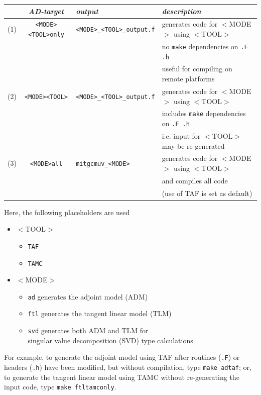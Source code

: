 \begin{table}[!ht]
{\footnotesize
\begin{tabular}{|ccll|}
\hline
~ & {\it AD-target} & {\it output} & {\it description} \\
\hline
\hline
(1) & {\tt <MODE><TOOL>only} & {\tt <MODE>\_<TOOL>\_output.f}  & 
generates code for $<$MODE$>$ using $<$TOOL$>$ \\
~ & ~ & ~ & no {\tt make} dependencies on {\tt .F .h} \\
~ & ~ & ~ & useful for compiling on remote platforms \\
\hline
(2) & {\tt <MODE><TOOL>} & {\tt <MODE>\_<TOOL>\_output.f}  & 
generates code for $<$MODE$>$ using $<$TOOL$>$ \\
~ & ~ & ~ & includes {\tt make} dependencies on {\tt .F .h} \\
~ & ~ & ~ & i.e. input for $<$TOOL$>$ may be re-generated \\
\hline
(3) & {\tt <MODE>all} & {\tt mitgcmuv\_<MODE>}  & 
generates code for $<$MODE$>$ using $<$TOOL$>$ \\
~ & ~ & ~ & and compiles all code \\
~ & ~ & ~ & (use of TAF is set as default) \\
\hline
\end{tabular}
}
\end{table}
%
Here, the following placeholders are used
%
\begin{itemize}
%
\item $<$TOOL$>$
%
\begin{itemize}
%
\item {\tt TAF}
\item {\tt TAMC}
%
\end{itemize}
%
\item $<$MODE$>$
%
\begin{itemize}
%
\item {\tt ad} generates the adjoint model (ADM)
\item {\tt ftl} generates the tangent linear model (TLM)
\item {\tt svd} generates both ADM and TLM for \\
singular value decomposition (SVD) type calculations
%
\end{itemize}
%
\end{itemize}

For example, to generate the adjoint model using TAF after routines ({\tt .F})
or headers ({\tt .h}) have been modified, but without compilation,
type {\tt make adtaf};
or, to generate the tangent linear model using TAMC without
re-generating the input code, type {\tt make ftltamconly}.


